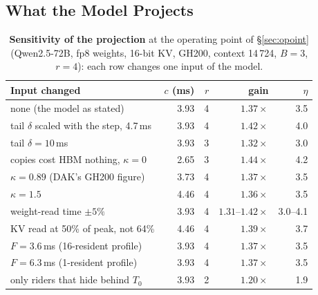 \subsection{What the Model Projects}\label{sec:eval-proj}

\begin{table}[t]
\centering\small\setlength{\tabcolsep}{4pt}
\caption{\textbf{Sensitivity of the projection} at the operating point of
\S\ref{sec:opoint} (Qwen2.5-72B, fp8 weights, 16-bit KV, GH200, context
14\,724, $B{=}3$, $r{=}4$): each row changes one input of the model.}
\label{tab:sens}
\begin{tabular}{@{}l r r r r@{}}
\toprule
Input changed & $c$ (ms) & $r$ & gain & $\eta$ \\
\midrule
none (the model as stated)                  & 3.93 & 4 & $1.37\times$ & 3.5 \\
tail $\delta$ scaled with the step, 4.7\,ms   & 3.93 & 4 & $1.42\times$ & 4.0 \\
tail $\delta = 10$\,ms                        & 3.93 & 3 & $1.32\times$ & 3.0 \\
copies cost HBM nothing, $\kappa = 0$         & 2.65 & 3 & $1.44\times$ & 4.2 \\
$\kappa = 0.89$ (DAK's GH200 figure)         & 3.73 & 4 & $1.37\times$ & 3.5 \\
$\kappa = 1.5$                                & 4.46 & 4 & $1.36\times$ & 3.5 \\
weight-read time $\pm 5\%$                    & 3.93 & 4 & $1.31$--$1.42\times$ & 3.0--4.1 \\
KV read at 50\% of peak, not 64\%             & 4.46 & 4 & $1.39\times$ & 3.7 \\
$F = 3.6$\,ms (16-resident profile)           & 3.93 & 4 & $1.37\times$ & 3.5 \\
$F = 6.3$\,ms (1-resident profile)            & 3.93 & 4 & $1.37\times$ & 3.5 \\
only riders that hide behind $T_0$            & 3.93 & 2 & $1.20\times$ & 1.9 \\
\bottomrule
\end{tabular}
\end{table}

